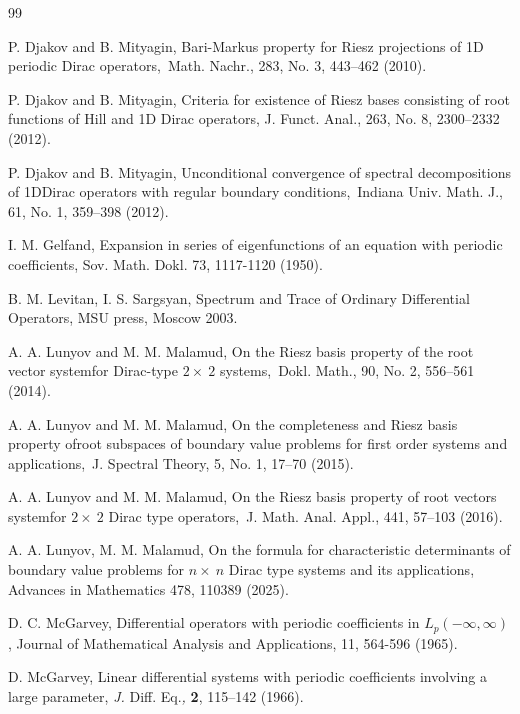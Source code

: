 \documentclass{article}%
\begin{document}
\begin{thebibliography}{99}                                                                                               %


\bibitem {}P. Djakov and B. Mityagin, Bari-Markus property for Riesz
projections of 1D periodic Dirac operators,\ Math. Nachr., 283, No. 3,
443--462 (2010).

\bibitem {}P. Djakov and B. Mityagin, Criteria for existence of Riesz bases
consisting of root functions of Hill and 1D Dirac operators, J. Funct. Anal.,
263, No. 8, 2300--2332 (2012).

\bibitem {}P. Djakov and B. Mityagin, Unconditional convergence of spectral
decompositions of 1DDirac operators with regular boundary conditions,\ Indiana
Univ. Math. J., 61, No. 1, 359--398 (2012).

\bibitem {}I. M. Gelfand, Expansion in series of eigenfunctions of an equation
with periodic coefficients, Sov. Math. Dokl. {73}, 1117-1120 (1950).

\bibitem {}B. M. Levitan, I. S. Sargsyan, Spectrum and Trace of Ordinary
Differential Operators, MSU press, Moscow 2003.

\bibitem {}A. A. Lunyov and M. M. Malamud, On the Riesz basis property of the
root vector systemfor Dirac-type $2\times\ 2$ systems,\ Dokl. Math., 90, No.
2, 556--561 (2014).

\bibitem {}A. A. Lunyov and M. M. Malamud, On the completeness and Riesz basis
property ofroot subspaces of boundary value problems for first order systems
and applications,\ J. Spectral Theory, 5, No. 1, 17--70 (2015).

\bibitem {}A. A. Lunyov and M. M. Malamud, On the Riesz basis property of root
vectors systemfor $2\times\ 2$ Dirac type operators,\ J. Math. Anal. Appl.,
441, 57--103 (2016).

\bibitem {}A. A. Lunyov, M. M. Malamud, On the formula for characteristic
determinants of boundary value problems for $n\times\ n$ Dirac type systems
and its applications, Advances in Mathematics 478, 110389 (2025).

\bibitem {}D. C. McGarvey, Differential operators with periodic coefficients
in $L_{p}(-\infty,\infty)$, Journal of Mathematical Analysis and Applications,
{11}, 564-596 (1965).

\bibitem {}D. McGarvey, Linear differential systems with periodic coefficients
involving a large parameter, \textit{J. }Diff. Eq.\textit{,} \textbf{2},
115--142 (1966).


\end{thebibliography}
\end{document}
